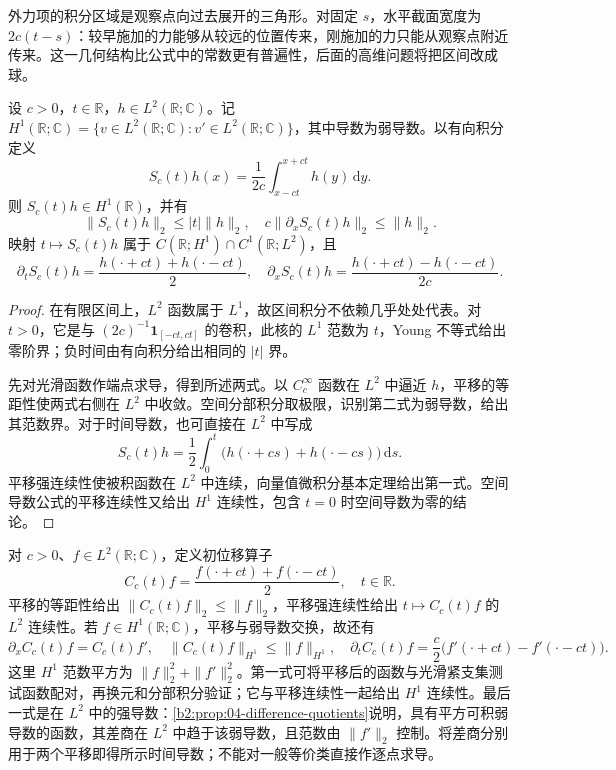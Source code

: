 外力项的积分区域是观察点向过去展开的三角形。对固定 \(s\)，水平截面宽度为 \(2c(t-s)\)：较早施加的力能够从较远的位置传来，刚施加的力只能从观察点附近传来。这一几何结构比公式中的常数更有普遍性，后面的高维问题将把区间改成球。

\begin{proposition}[初速度传播的平方范数界]\label{b2:prop:09-velocity-propagator}
设 \(c>0\)，\(t\in\mathbb R\)，\(h\in L^2(\mathbb R;\mathbb C)\)。记 \(H^1(\mathbb R;\mathbb C)=\{v\in L^2(\mathbb R;\mathbb C):v'\in L^2(\mathbb R;\mathbb C)\}\)，其中导数为弱导数。以有向积分定义
\[
 S_c(t)h(x)=\frac1{2c}\int_{x-ct}^{x+ct}h(y)\,\mathrm dy.
\]
则 \(S_c(t)h\in H^1(\mathbb R)\)，并有
\[
 \|S_c(t)h\|_2\leq|t|\|h\|_2,
 \quad c\|\partial_xS_c(t)h\|_2\leq\|h\|_2.
\]
映射 \(t\mapsto S_c(t)h\) 属于 \(C(\mathbb R;H^1)\cap C^1(\mathbb R;L^2)\)，且
\[
 \partial_tS_c(t)h=\frac{h(\cdot+ct)+h(\cdot-ct)}2,
 \quad\partial_xS_c(t)h=\frac{h(\cdot+ct)-h(\cdot-ct)}{2c}.
\]
\end{proposition}
\begin{proof}
在有限区间上，\(L^2\) 函数属于 \(L^1\)，故区间积分不依赖几乎处处代表。对 \(t>0\)，它是与 \((2c)^{-1}\mathbf1_{[-ct,ct]}\) 的卷积，此核的 \(L^1\) 范数为 \(t\)，Young 不等式给出零阶界；负时间由有向积分给出相同的 \(|t|\) 界。

先对光滑函数作端点求导，得到所述两式。以 \(C_c^\infty\) 函数在 \(L^2\) 中逼近 \(h\)，平移的等距性使两式右侧在 \(L^2\) 中收敛。空间分部积分取极限，识别第二式为弱导数，给出其范数界。对于时间导数，也可直接在 \(L^2\) 中写成
\[
 S_c(t)h=\frac12\int_0^t
 \bigl(h(\cdot+cs)+h(\cdot-cs)\bigr)\,\mathrm{d}s.
\]
平移强连续性使被积函数在 \(L^2\) 中连续，向量值微积分基本定理给出第一式。空间导数公式的平移连续性又给出 \(H^1\) 连续性，包含 \(t=0\) 时空间导数为零的结论。
\end{proof}

对 \(c>0\)、\(f\in L^2(\mathbb R;\mathbb C)\)，定义初位移算子
\[
 C_c(t)f=\frac{f(\cdot+ct)+f(\cdot-ct)}2,\quad t\in\mathbb R.
\]
平移的等距性给出 \(\|C_c(t)f\|_2\leq\|f\|_2\)，平移强连续性给出 \(t\mapsto C_c(t)f\) 的 \(L^2\) 连续性。若 \(f\in H^1(\mathbb R;\mathbb C)\)，平移与弱导数交换，故还有
\[
 \partial_xC_c(t)f=C_c(t)f',\quad
 \|C_c(t)f\|_{H^1}\leq\|f\|_{H^1},\quad
 \partial_tC_c(t)f=\frac c2\bigl(f'(\cdot+ct)-f'(\cdot-ct)\bigr).
\]
这里 \(H^1\) 范数平方为 \(\|f\|_2^2+\|f'\|_2^2\)。第一式可将平移后的函数与光滑紧支集测试函数配对，再换元和分部积分验证；它与平移连续性一起给出 \(H^1\) 连续性。最后一式是在 \(L^2\) 中的强导数：\cref{b2:prop:04-difference-quotients}说明，具有平方可积弱导数的函数，其差商在 \(L^2\) 中趋于该弱导数，且范数由 \(\|f'\|_2\) 控制。将差商分别用于两个平移即得所示时间导数；不能对一般等价类直接作逐点求导。

